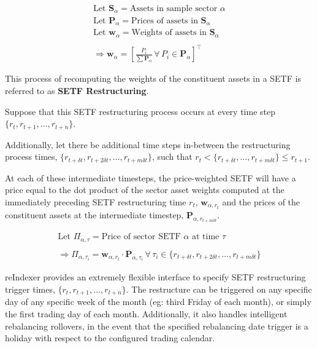 \documentclass[../main.tex]{subfiles}
\begin{document}
\begin{gather*}
    \text{Let $\boldsymbol{S}_\alpha$} = \text{Assets in sample sector $\alpha$} \\
    \text{Let $\boldsymbol{P}_\alpha$} = \text{Prices of assets in $\boldsymbol{S}_\alpha$} \\
    \text{Let $\boldsymbol{w}_\alpha$} = \text{Weights of assets in $\boldsymbol{S}_\alpha$} \\
    \\
    \Rightarrow \boldsymbol{w}_\alpha = \left[ \frac{P_i}{\sum \boldsymbol{P}_\alpha} \, \forall \, P_i \in \boldsymbol{P}_\alpha \right]^\intercal
\end{gather*}

This process of recomputing the weights of the constituent assets in a SETF is referred to as \textbf{SETF Restructuring}.

Suppose that this SETF restructuring process occurs at every time step $\{ r_t, r_{t+1}, \ldots, r_{t+n} \}$.

Additionally, let there be additional time steps in-between the restructuring process times, $\{ r_{t + \delta t}, r_{t + 2\delta t}, \ldots, r_{t + m \delta t} \}$, such that {${r_t < \{ r_{t + \delta t}, \ldots, r_{t + m\delta t} \} \leq r_{t + 1}}$}.

At each of these intermediate timesteps, the price-weighted SETF will have a price equal to the dot product of the sector asset weights computed at the immediately preceding SETF restructuring time $r_{t}$, $\boldsymbol{w}_{\alpha,r_t}$ and the prices of the constituent assets at the intermediate timestep, $\boldsymbol{P}_{\alpha,r_{t+m\delta t}}$.

\begin{gather*}
    \text{Let $\Pi_{\alpha,\tau}$} = \text{Price of sector SETF $\alpha$ at time $\tau$} \\
    \\
    \Rightarrow \Pi_{\alpha,\tau_i} = \boldsymbol{w}_{\alpha, r_t} \cdot \boldsymbol{P}_{\alpha,\tau_i} \, \forall \, \tau_i \in \{ r_{t + \delta t}, r_{t + 2\delta t}, \ldots, r_{t + m \delta t} \}
\end{gather*}

reIndexer provides an extremely flexible interface to specify SETF restructuring trigger times, $\{ r_t, r_{t+1}, \ldots, r_{t+n} \}$. The restructure can be triggered on any specific day of any specific week of the month (eg: third Friday of each month), or simply the first trading day of each month. Additionally, it also handles intelligent rebalancing rollovers, in the event that the specified rebalancing date trigger is a holiday with respect to the configured trading calendar.
\end{document}
